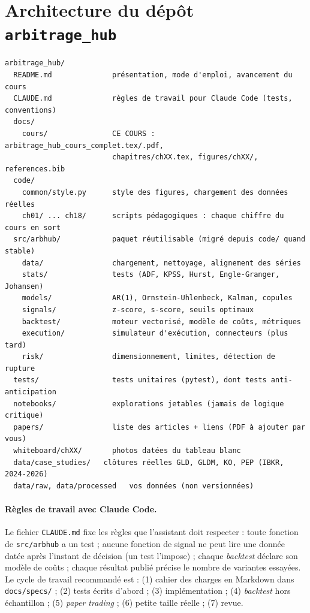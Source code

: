 \section{Architecture du dépôt \texttt{arbitrage\_hub}}

{\footnotesize\begin{verbatim}
arbitrage_hub/
  README.md              présentation, mode d'emploi, avancement du cours
  CLAUDE.md              règles de travail pour Claude Code (tests, conventions)
  docs/
    cours/               CE COURS : arbitrage_hub_cours_complet.tex/.pdf,
                         chapitres/chXX.tex, figures/chXX/, references.bib
  code/
    common/style.py      style des figures, chargement des données réelles
    ch01/ ... ch18/      scripts pédagogiques : chaque chiffre du cours en sort
  src/arbhub/            paquet réutilisable (migré depuis code/ quand stable)
    data/                chargement, nettoyage, alignement des séries
    stats/               tests (ADF, KPSS, Hurst, Engle-Granger, Johansen)
    models/              AR(1), Ornstein-Uhlenbeck, Kalman, copules
    signals/             z-score, s-score, seuils optimaux
    backtest/            moteur vectorisé, modèle de coûts, métriques
    execution/           simulateur d'exécution, connecteurs (plus tard)
    risk/                dimensionnement, limites, détection de rupture
  tests/                 tests unitaires (pytest), dont tests anti-anticipation
  notebooks/             explorations jetables (jamais de logique critique)
  papers/                liste des articles + liens (PDF à ajouter par vous)
  whiteboard/chXX/       photos datées du tableau blanc
  data/case_studies/   clôtures réelles GLD, GLDM, KO, PEP (IBKR, 2024-2026)
  data/raw, data/processed   vos données (non versionnées)
\end{verbatim}}

\paragraph{Règles de travail avec Claude Code.} Le fichier \texttt{CLAUDE.md} fixe les règles que l'assistant doit respecter : toute fonction de \texttt{src/arbhub} a un test ; aucune fonction de signal ne peut lire une donnée datée après l'instant de décision (un test l'impose) ; chaque \emph{backtest} déclare son modèle de coûts ; chaque résultat publié précise le nombre de variantes essayées. Le cycle de travail recommandé est : (1) cahier des charges en Markdown dans \texttt{docs/specs/} ; (2) tests écrits d'abord ; (3) implémentation ; (4) \emph{backtest} hors échantillon ; (5) \emph{paper trading} ; (6) petite taille réelle ; (7) revue.

